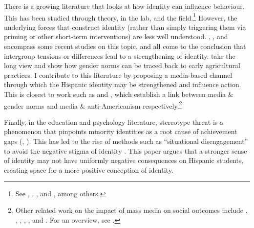 \documentclass[11pt]{article}
\begin{document}
There is a growing literature that looks at how identity can influence behaviour. This has been studied through theory, in the lab, and the field.\footnote{ See \cite{akerlof2000economics}, \cite{benjamin_social_2007}, \cite{benjamin_religious_2010}, and \cite{bursztyn2019moral}, among others.} However, the underlying forces that construct identity (rather than simply triggering them via priming or other short-term interventions) are less well understood. \cite{bisin_bend_2010}, \cite{atkin_how_2019}, and \cite{bazzi_unity_2019} encompass some recent studies on this topic, and all come to the conclusion that intergroup tensions or differences lead to a strengthening of identity. \cite{alesina2013origins} take the long view and show how gender norms can be traced back to early agricultural practices. I contribute to this literature by proposing a media-based channel through which the Hispanic identity may be strengthened and influence action. This is closest to work such as \cite{jensen_power_2009} and \cite{gentzkow_media_2004}, which establish a link between media \& gender norms and media \& anti-Americanism respectively.\footnote{ Other related work on the impact of mass media on social outcomes include \cite{ferrara_soap_2012}, \cite{kearney_media_2015},  \cite{olken_television_2009}, \cite{dellavigna_fox_2007},  \cite{yanagizawa-drott_propaganda_2014}, and \cite{putnam_bowling_2001}. For an overview, see \cite{dellavigna_economic_2015}.} 

Finally, in the education and psychology literature, stereotype threat is a phenomenon that pinpoints minority identities as a root cause of achievement gaps (\cite{appel2012stereotypes}, \cite{spencer2016stereotype}). This has led to the rise of methods such as ``situational disengagement'' to avoid the negative stigma of identity \citep{nussbaum2007situational}. This paper argues that a stronger sense of identity may not have uniformly negative consequences on Hispanic students, creating space for a more positive conception of identity.





 
\end{document}
